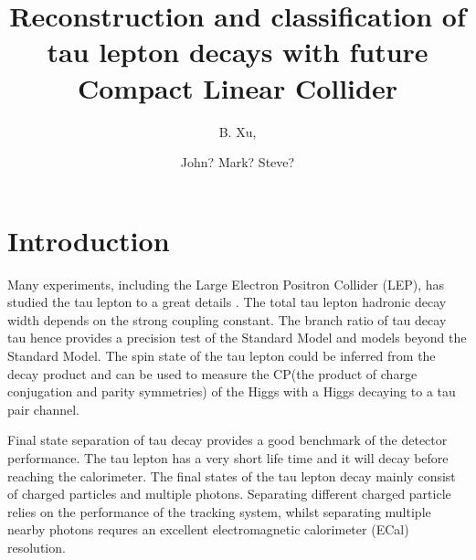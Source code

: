 \documentclass[a4paper,11pt]{article}
\title{\boldmath Reconstruction and classification of tau lepton decays with future Compact Linear Collider}
\author[a,1]{B. Xu,\note{Corresponding author.}}
\author[a]{John? Mark? Steve?}
\affiliation[a]{Cavendish Laboratory,\\JJ Thomson Avenue, Cambridge, CB3 0HE, UK}
\begin{document}
\maketitle
\flushbottom


\section{Introduction}

Many experiments, including the Large Electron Positron Collider (LEP), has studied the tau lepton to a great details \cite{Schael:2005am}. The total tau lepton hadronic decay width depends on the strong coupling constant. The branch ratio of tau decay tau hence provides a precision test of the Standard Model and models beyond the Standard Model. The spin state of the tau lepton could be inferred from the decay product and can be used to measure the CP(the product of charge conjugation and parity symmetries) of the Higgs with a Higgs decaying to a tau pair channel.



Final state separation of tau decay provides a good benchmark of the detector performance. The tau lepton has a very short life time and it will decay before reaching the calorimeter. The final states of the tau lepton decay mainly consist of charged particles and multiple photons. Separating different charged particle relies on the performance of the tracking system, whilst separating multiple nearby photons requres an excellent electromagnetic calorimeter (ECal) resolution. 

\end{document}
